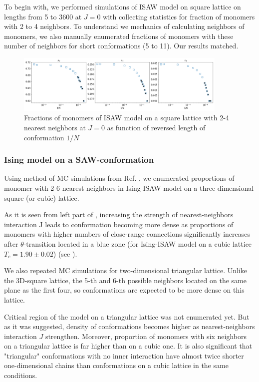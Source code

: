 \documentclass[a4paper]{jpconf}
\begin{document}
To begin with, we performed simulations of ISAW model on square lattice on lengths from 5 to 3600 at $J=0$ with collecting statistics for fraction of monomers with 2 to 4 neighbors. To understand we mechanics of calculating neighbors of monomers, we also manually enumerated fractions of monomers with these number of neighbors for short conformations (5 to 11). Our results matched.

\begin{figure}[h!]
    \centering
    \includegraphics[width=0.9\textwidth]{Images/ISAWJ0_Bulk2-4.png}
    \caption{Fractions of monomers of ISAW model on a square lattice with 2-4 nearest neighbors at $J=0$ as function of reversed length of conformation $1/N$}
    \label{fig:Ising_vs_ISAW}
\end{figure}

\subsubsection{Ising model on a SAW-conformation}

Using method of MC simulations from Ref. \cite{faizullina2021critical}, we enumerated proportions of monomer with 2-6 nearest neighbors in Ising-ISAW model on a three-dimensional square (or cubic) lattice.

As it is seen from left part of , increasing the strength of nearest-neighbors interaction J leads to conformation becoming more dense as proportions of monomers with higher numbers of close-range connections significantly increases after $\theta$-transition located in a blue zone (for Ising-ISAW model on a cubic lattice $T_{c} = 1.90 \pm 0.02$\cite{Foster2021}) (see ).

We also repeated MC simulations for two-dimensional triangular lattice. Unlike the 3D-square lattice, the 5-th and 6-th possible neighbors located on the same plane as the first four, so conformations are expected to be more dense on this lattice.


Critical region of the model on a triangular lattice was not enumerated yet. But as it was suggested, density of conformations becomes higher as nearest-neighbors interaction $J$ strengthen. Moreover, proportion of monomers with six neighbors on a triangular lattice is far higher than on a cubic one. It is also significant that "triangular" conformations with no inner interaction have almost twice shorter one-dimensional chains than conformations on a cubic lattice in the same conditions.
\end{document}

